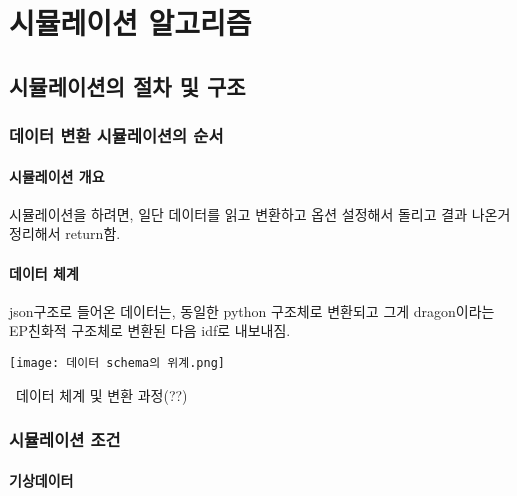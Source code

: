 \part{시뮬레이션 알고리즘}
\label{part:algorithm}


\chapter{시뮬레이션의 절차 및 구조}

\section{데이터 변환 시뮬레이션의 순서}

\subsection{시뮬레이션 개요}
시뮬레이션을 하려면, 일단 데이터를 읽고 변환하고 옵션 설정해서 돌리고 결과 나온거 정리해서 return함.

\subsection{데이터 체계}
json구조로 들어온 데이터는, 동일한 python 구조체로 변환되고 그게 dragon이라는 EP친화적 구조체로 변환된 다음 idf로 내보내짐.

\begin{defaultfigure}
  \texttt{[image: 데이터 schema의 위계.png]}
  \caption{\simulator\ 데이터 체계 및 변환 과정(??)}
  \label{fig:data_hierarchy}
\end{defaultfigure}


\section{시뮬레이션 조건}
\subsection{기상데이터}
